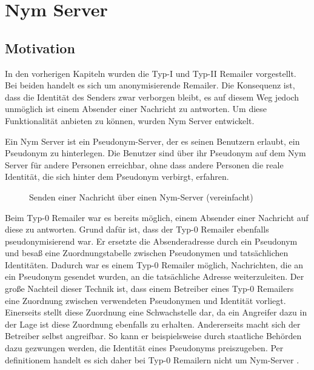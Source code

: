 \chapter{Nym Server}

\section{Motivation}
In den vorherigen Kapiteln wurden die Typ-I und Typ-II Remailer vorgestellt. Bei beiden handelt es sich um anonymisierende Remailer. Die Konsequenz ist, dass die Identität des Senders zwar verborgen bleibt, es auf diesem Weg jedoch unmöglich ist einem Absender einer Nachricht zu antworten. Um diese Funktionalität anbieten zu können, wurden Nym Server entwickelt.

Ein Nym Server ist ein Pseudonym-Server, der es seinen Benutzern erlaubt, ein Pseudonym zu hinterlegen. Die Benutzer sind über ihr Pseudonym auf dem Nym Server für andere Personen  erreichbar, ohne dass andere Personen die reale Identität, die sich hinter dem Pseudonym verbirgt, erfahren.

\begin{figure}
	\centering
	\begin{sequencediagram}
	\end{sequencediagram}
	\caption{Senden einer Nachricht über einen Nym-Server (vereinfacht)}
\end{figure}

Beim Typ-0 Remailer war es bereits möglich, einem Absender einer Nachricht auf diese zu antworten. Grund dafür ist, dass der Typ-0 Remailer ebenfalls pseudonymisierend war. Er ersetzte die Absenderadresse durch ein Pseudonym und besaß eine Zuordnungstabelle zwischen Pseudonymen und tatsächlichen Identitäten. Dadurch war es einem Typ-0 Remailer möglich, Nachrichten, die an ein Pseudonym gesendet wurden, an die tatsächliche Adresse weiterzuleiten. Der große Nachteil dieser Technik ist, dass einem Betreiber eines Typ-0 Remailers eine Zuordnung zwischen verwendeten Pseudonymen und Identität vorliegt. Einerseits stellt diese Zuordnung eine Schwachstelle dar, da ein Angreifer dazu in der Lage ist diese Zuordnung ebenfalls zu erhalten. Andererseits macht sich der Betreiber selbst angreifbar. So kann er beispielsweise durch staatliche Behörden dazu gezwungen werden, die Identität eines Pseudonyms preiszugeben. Per definitionem handelt es sich daher bei Typ-0 Remailern nicht um Nym-Server \cite{nymdefinition}.

